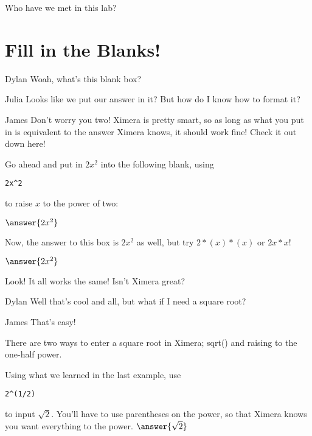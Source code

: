 \documentclass{ximera}
\begin{document}
\begin{question}
Who have we met in this lab?
\begin{selectAll}
\end{selectAll}
\end{question}

\section{Fill in the Blanks!}
\begin{dialogue}
\item[Dylan] Woah, what's this blank box?
\item[Julia] Looks like we put our answer in it? But how do I know how to format it?
\item[James] Don't worry you two! Ximera is pretty smart, so as long as what you put in is equivalent to the answer Ximera knows, it should work fine! Check it out down here!
\end{dialogue}

\begin{question}
Go ahead and put in $2x^2$ into the following blank, using
\begin{verbatim}
2x^2
\end{verbatim}
to raise $x$ to the power of two:

$\answer{2x^2}$

Now, the answer to this box is $2x^2$ as well, but try $2*(x)*(x)$ or $2x*x$!

$\answer{2x^2}$
\begin{feedback}[correct]
Look! It all works the same! Isn't Ximera great?
\end{feedback}
\end{question}

\begin{dialogue}
\item[Dylan] Well that's cool and all, but what if I need a square root?
\item[James] That's easy!
\end{dialogue}

There are two ways to enter a square root in Ximera; sqrt() and raising to the one-half power.

\begin{question}
Using what we learned in the last example, use
\begin{verbatim}
2^(1/2)
\end{verbatim}
to input $\sqrt{2}$. You'll have to use parentheses on the power, so that Ximera knows you want everything to the power.
$\answer{\sqrt{2}}$
\end{question}
\end{document}
